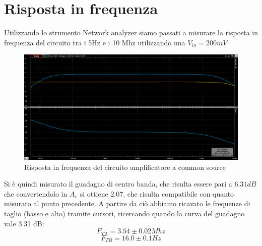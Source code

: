 \documentclass[10pt, a4paper, italian]{article}
\begin{document}
\section{Risposta in frequenza}
Utilizzando lo strumento Network analyzer siamo passati a misurare la risposta in frequenza del circuito tra i 5Hz e i 10 Mhz utilizzando una $V_{in}=200 mV$\\
\begin{figure}[H]
    \centering
	\includegraphics[scale=0.4]{network}
    \caption{Risposta in frequenza del circuito amplificatore a common source}
\end{figure}
Si è quindi misurato il guadagno di centro banda, che risulta essere pari a $6.31 dB$ che convertendolo in $A_v$ si ottiene $2.07$, che risulta compatibile con quanto misurato al punto precedente.
A partire da ciò abbiamo ricavato le frequenze di taglio (basso e alto) tramite cursori, ricercando quando la curva del guadagno vale 3.31 dB:
\[
F_{TA}=3.54 \pm 0.02Mhz
\]
\[
F_{TB}= 16.0 \pm 0.1Hz
\]
\end{document}
